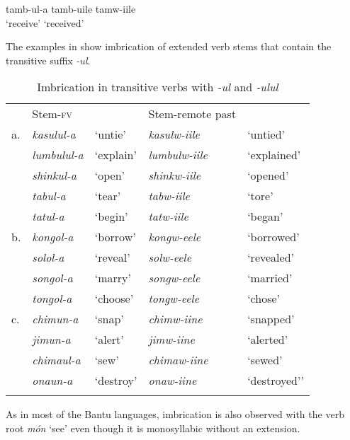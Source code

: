 \documentclass[output=paper]{langsci/langscibook}
\begin{document}
\gll tamb-ul-a    tamb-uile    tamw-iile \\
‘receive’ {} ‘received’ \\

\z

The examples in  show imbrication of extended verb stems that contain the transitive suffix \textit{-ul}.


\begin{table}
\begin{tabular}{lllll}
\lsptoprule
 & Stem-\textsc{fv} &  & Stem-remote past & \\
a. & \textit{kasulul-a} & `untie' & \textit{kasulw-iile} & `untied' \\
 & \textit{lumbulul-a} & `explain' & \textit{lumbulw-iile} & `explained' \\
 & \textit{shinkul-a} & `open' & \textit{shinkw-iile} & `opened' \\
 & \textit{tabul-a} & `tear' & \textit{tabw-iile} & `tore' \\
 & \textit{tatul-a} & `begin' & \textit{tatw-iile} & `began' \\

b. & \textit{kongol-a} & `borrow' & \textit{kongw-eele} & `borrowed' \\
 & \textit{solol-a} & `reveal' & \textit{solw-eele} & `revealed' \\
 & \textit{songol-a} & `marry' & \textit{songw-eele} & `married' \\
 & \textit{tongol-a} & `choose' & \textit{tongw-eele} & `chose' \\

c. & \textit{chimun-a} & `snap' & \textit{chimw-iine} & `snapped' \\
 & \textit{jimun-a} & `alert' & \textit{jimw-iine} & `alerted' \\
 & \textit{chimaul-a} & `sew' & \textit{chimaw-iine} & `sewed' \\
 & \textit{onaun-a} & `destroy' & \textit{onaw-iine} & `destroyed’' \\

\lspbottomrule
\end{tabular}

\caption{Imbrication in transitive verbs with \textit{-ul} and \textit{-ulul}}
\label{tab:23.kawasha}

\end{table}


As in most of the Bantu languages, imbrication is also observed with the verb root \textit{món} ‘see’ even though it is monosyllabic without an extension. 
\end{document}
